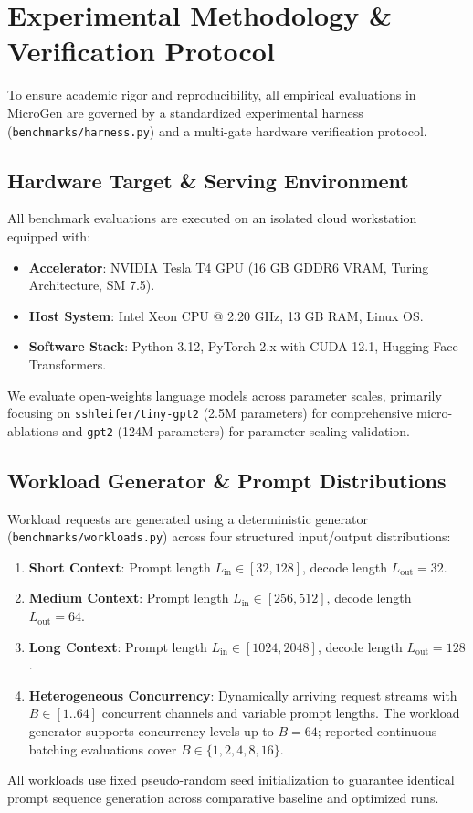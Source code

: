 \section{Experimental Methodology \& Verification Protocol}
\label{sec:methodology}

To ensure academic rigor and reproducibility, all empirical evaluations in \textsf{MicroGen} are governed by a standardized experimental harness (\texttt{benchmarks/harness.py}) and a multi-gate hardware verification protocol.

\subsection{Hardware Target \& Serving Environment}
\label{sec:meth_hardware}

All benchmark evaluations are executed on an isolated cloud workstation equipped with:
\begin{itemize}
    \item \textbf{Accelerator}: NVIDIA Tesla T4 GPU (16 GB GDDR6 VRAM, Turing Architecture, SM 7.5).
    \item \textbf{Host System}: Intel Xeon CPU @ 2.20 GHz, 13 GB RAM, Linux OS.
    \item \textbf{Software Stack}: Python 3.12, PyTorch 2.x with CUDA 12.1, Hugging Face Transformers.
\end{itemize}
We evaluate open-weights language models across parameter scales, primarily focusing on \texttt{sshleifer/tiny-gpt2} (2.5M parameters) for comprehensive micro-ablations and \texttt{gpt2} (124M parameters) for parameter scaling validation.

\subsection{Workload Generator \& Prompt Distributions}
\label{sec:meth_workloads}

Workload requests are generated using a deterministic generator (\texttt{benchmarks/workloads.py}) across four structured input/output distributions:
\begin{enumerate}
    \item \textbf{Short Context}: Prompt length $L_{\text{in}} \in [32, 128]$, decode length $L_{\text{out}} = 32$.
    \item \textbf{Medium Context}: Prompt length $L_{\text{in}} \in [256, 512]$, decode length $L_{\text{out}} = 64$.
    \item \textbf{Long Context}: Prompt length $L_{\text{in}} \in [1024, 2048]$, decode length $L_{\text{out}} = 128$.
    \item \textbf{Heterogeneous Concurrency}: Dynamically arriving request streams with $B \in [1..64]$ concurrent channels and variable prompt lengths. The workload generator supports concurrency levels up to $B=64$; reported continuous-batching evaluations cover $B \in \{1, 2, 4, 8, 16\}$.
\end{enumerate}
All workloads use fixed pseudo-random seed initialization to guarantee identical prompt sequence generation across comparative baseline and optimized runs.

